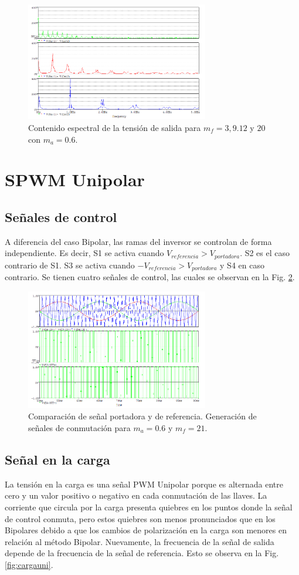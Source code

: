 \documentclass[conference]{IEEEtran}
\begin{document}
\begin{figure}[b]
	\centering
	\includegraphics[width=8cm]{imagenes/bipolar/mf}
	\caption{Contenido espectral de la tensión de salida para $m_f = 3, 9.12$ y $20$ con $m_a = 0.6$.}
	\label{fig:mfbi}
\end{figure}

\section{SPWM Unipolar}
\subsection{Señales de control}
A diferencia del caso Bipolar, las ramas del inversor se controlan de forma independiente. Es decir, S1 se activa cuando $V_{referencia} > V_{portadora}$. S2 es el caso contrario de S1. S3 se activa cuando $- V_{referencia} > V_{portadora}$ y S4 en caso contrario. Se tienen cuatro señales de control, las cuales se observan en la Fig. \ref{fig:controluni}.
\begin{figure}[t]
	\centering
	\includegraphics[width=8cm]{imagenes/unipolar/control}
	\caption{Comparación de señal portadora y de referencia. Generación de señales de conmutación para $m_a = 0.6$ y $m_f = 21$.}
	\label{fig:controluni}
\end{figure}
\subsection{Señal en la carga}
La tensión en la carga es una señal PWM Unipolar porque es alternada entre cero y un valor positivo o negativo en cada conmutación de las llaves. La corriente que circula por la carga presenta quiebres en los puntos donde la señal de control conmuta, pero estos quiebres son menos pronunciados que en los Bipolares debido a que los cambios de polarización en la carga son menores en relación al método Bipolar. Nuevamente, la frecuencia de la señal de salida depende de la frecuencia de la señal de referencia. Esto se observa en la Fig. \ref{fig:cargauni}.
\end{document}
